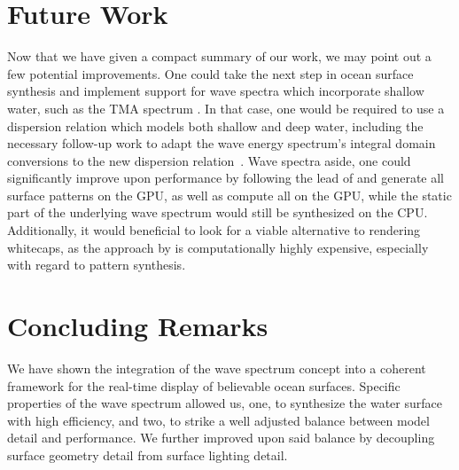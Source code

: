 \section{Future Work}
Now that we have given a compact summary of our work, we may point out a few
potential improvements.
One could take the next step in ocean surface synthesis and implement support
for wave spectra which incorporate shallow water, such as the TMA spectrum
\citep{Hughes:1984}. In that case, one would be required to use a dispersion
relation which models both shallow and deep water, including the necessary
follow-up work to adapt the wave energy spectrum's integral domain conversions
to the new dispersion relation~\citep{Horvath:2015}.
Wave spectra aside, one could significantly improve upon performance by
following the lead of \cite{misc:oceanlightingfft} and generate all
surface patterns on the GPU, as well as compute all \FourierTransforms
on the GPU, while the static part of the underlying wave spectrum
would still be synthesized on the CPU. Additionally, it would beneficial
to look for a viable alternative to rendering whitecaps, as the approach
by \citet{article:whitecaps} is computationally highly expensive,
especially with regard to pattern synthesis.

\section{Concluding Remarks}
We have shown the integration of the wave spectrum concept into a
coherent framework for the real-time display of believable ocean
surfaces. Specific properties of the wave spectrum allowed us, one,
to synthesize the water surface with high efficiency, and two, to
strike a well adjusted balance between model detail and performance.
We further improved upon said balance
by decoupling surface geometry detail from surface lighting detail.
% 
%
%
